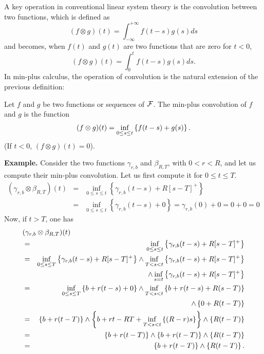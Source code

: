 A key operation in conventional linear system theory is the convolution between two functions,
which is defined as
$$ (f \otimes g)(t) = \int_{-\infty}^{+\infty} f(t-s)g(s) ds $$
and becomes, when $f(t)$ and $g(t)$ are two functions that are
zero for $t < 0$,
$$ (f \otimes g)(t) = \int_{0}^{t} f(t-s)g(s) ds . $$
In min-plus calculus, the operation of convolution is the natural extension
of the previous definition:
\begin{definition}
Let $f$ and $g$ be two functions or sequences of $\mathcal F$. The min-plus convolution of $f$ and $g$
is the function
\begin{equation}
\mylabel{eq:minplusconvolution}
(f \otimes g)(t) = \inf_{0 \leq s \leq t} \left\{ f(t-s) + g(s) \right\}.
\end{equation}
(If $t < 0$,  $(f \otimes g)(t) = 0$).
\end{definition}
\noindent
{\bf Example.} Consider the two functions $\gamma_{r,b}$ and $\beta_{R,T}$,
with $0 < r < R$, and let us compute their min-plus convolution. Let us first
compute it for $0 \leq t \leq T$.
\begin{eqnarray*}
(\gamma_{r,b} \otimes \beta_{R,T})(t)
        & = & \inf_{0 \leq s \leq t} \left\{ \gamma_{r,b}(t-s) +  R[s-T]^{+} \right\} \\
         & = & \inf_{0 \leq s \leq t} \left\{ \gamma_{r,b}(t-s) + 0 \right\}
         =  \gamma_{r,b}(0) + 0 = 0 + 0 = 0
\end{eqnarray*}
Now, if $t > T$, one has
\begin{eqnarray*}
\lefteqn{ (\gamma_{r,b} \otimes \beta_{R,T})(t)}\\
& = & \inf_{0
\leq s \leq t} \left\{ \gamma_{r,b}(t-s) +  R[s-T]^{+} \right\} \\
        & = & \inf_{0 \leq s \leq T} \left\{ \gamma_{r,b}(t-s) +  R[s-T]^{+} \right\} \wedge
               \inf_{T < s < t} \left\{ \gamma_{r,b}(t-s) +  R[s-T]^{+} \right\} \\
        & & \;\;\;\;\;\;\; \wedge
            \inf_{s = t} \left\{ \gamma_{r,b}(t-s) +  R[s-T]^{+} \right\} \\
        & = & \inf_{0 \leq s \leq T} \left\{ b + r(t-s) + 0 \right\} \wedge
               \inf_{T < s < t} \left\{ b + r(t-s) +  R(s-T) \right\} \\
        & & \;\;\;\;\;\;\; \wedge
            \left\{ 0 +  R(t-T) \right\} \\
        & = & \left\{ b + r(t-T) \right\} \wedge \left\{b + rt -RT +
               \inf_{T < s < t} \left\{ (R-r)s \right\} \right\}
            \wedge \left\{ R(t-T) \right\} \\
        & = & \left\{ b + r(t-T) \right\} \wedge \left\{b + r(t-T) \right\}
            \wedge \left\{ R(t-T) \right\} \\
        & = & \left\{ b + r(t-T) \right\} \wedge  \left\{ R(t-T) \right\}.
\end{eqnarray*}
